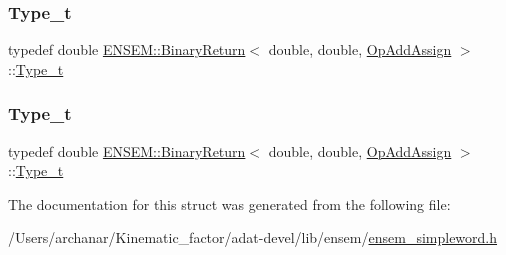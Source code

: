 \mbox{\label{structENSEM_1_1BinaryReturn_3_01double_00_01double_00_01OpAddAssign_01_4_a9b6757965dc033c66ff45da5c69ea6cc}} 
\subsubsection{\texorpdfstring{Type\_t}{Type\_t}\hspace{0.1cm}{\footnotesize\ttfamily [2/3]}}
{\footnotesize\ttfamily typedef double \mbox{\hyperlink{structENSEM_1_1BinaryReturn}{E\+N\+S\+E\+M\+::\+Binary\+Return}}$<$ double, double, \mbox{\hyperlink{structENSEM_1_1OpAddAssign}{Op\+Add\+Assign}} $>$\+::\mbox{\hyperlink{structENSEM_1_1BinaryReturn_3_01double_00_01double_00_01OpAddAssign_01_4_a9b6757965dc033c66ff45da5c69ea6cc}{Type\+\_\+t}}}

\mbox{\label{structENSEM_1_1BinaryReturn_3_01double_00_01double_00_01OpAddAssign_01_4_a9b6757965dc033c66ff45da5c69ea6cc}} 
\subsubsection{\texorpdfstring{Type\_t}{Type\_t}\hspace{0.1cm}{\footnotesize\ttfamily [3/3]}}
{\footnotesize\ttfamily typedef double \mbox{\hyperlink{structENSEM_1_1BinaryReturn}{E\+N\+S\+E\+M\+::\+Binary\+Return}}$<$ double, double, \mbox{\hyperlink{structENSEM_1_1OpAddAssign}{Op\+Add\+Assign}} $>$\+::\mbox{\hyperlink{structENSEM_1_1BinaryReturn_3_01double_00_01double_00_01OpAddAssign_01_4_a9b6757965dc033c66ff45da5c69ea6cc}{Type\+\_\+t}}}



The documentation for this struct was generated from the following file\+:\begin{DoxyCompactItemize}
\item 
/\+Users/archanar/\+Kinematic\+\_\+factor/adat-\/devel/lib/ensem/\mbox{\hyperlink{adat-devel_2lib_2ensem_2ensem__simpleword_8h}{ensem\+\_\+simpleword.\+h}}\end{DoxyCompactItemize}
